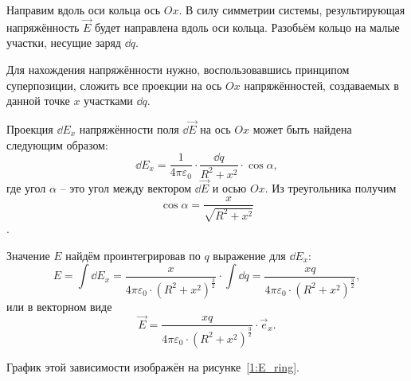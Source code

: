     \begin{solution}
        Направим вдоль оси кольца ось \( Ox \). В силу симметрии системы, 
        результирующая напряжённость \( \vec{E} \) будет направлена вдоль оси 
        кольца. Разобьём кольцо на малые участки, несущие заряд \( \dd q \).

        Для нахождения напряжённости нужно, воспользовавшись принципом 
        суперпозиции, сложить все проекции на ось \( Ox \) напряжённостей, 
        создаваемых в данной точке \( x \) участками \( \dd q \).

        Проекция \( \dd E_x \) напряжённости поля \( \dd\vec{E} \) на ось
        \( Ox \) может быть найдена следующим образом:
        \[
            \dd E_x = \frac{1}{4\pi\varepsilon_0}\cdot
            \frac{\dd q}{R^2+x^2}\cdot\cos\alpha,
        \]
        где угол \( \alpha \) -- это угол между вектором \( \dd\vec{E} \) и 
        осью \( Ox \). Из треугольника получим
        \[ \cos\alpha = \frac{x}{\sqrt{R^2+x^2}} \].

        Значение \( E \) найдём проинтегрировав по \( q \) выражение для
        \( \dd E_{x} \): 
        \[
            E = \int \dd E_{x} = \frac{x}{4\pi\varepsilon_0\cdot
            (R^2+x^2)^\frac{3}{2}}\cdot\int \dd q = 
            \frac{xq}{4\pi\varepsilon_0\cdot(R^2+x^2)^\frac{3}{2}},
        \]
        или в векторном виде
        \[ 
            \vec{E} = \frac{xq}{4\pi\varepsilon_0\cdot
            (R^2+x^2)^\frac{3}{2}}\cdot\vec{e}_{x}.
        \]

        График этой зависимости изображён на рисунке~\ref{1:E_ring}.
    \end{solution}

